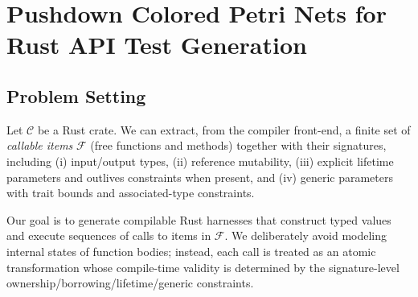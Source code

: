 \documentclass[sigconf]{acmart}
\begin{document}
\section{Pushdown Colored Petri Nets for Rust API Test Generation}
\label{sec:method}

\subsection{Problem Setting}
\label{sec:method:setting}
Let $\mathcal{C}$ be a Rust crate. We can extract, from the compiler front-end, a finite set of \emph{callable items}
$\mathcal{F}$ (free functions and methods) together with their signatures, including (i) input/output types, (ii) reference mutability, (iii) explicit lifetime parameters and outlives constraints when present, and (iv) generic parameters with trait bounds and associated-type constraints.

Our goal is to generate compilable Rust harnesses that construct typed values and execute sequences of calls to items in $\mathcal{F}$. We deliberately avoid modeling internal states of function bodies; instead, each call is treated as an atomic transformation whose compile-time validity is determined by the signature-level ownership/borrowing/lifetime/generic constraints.
\end{document}
